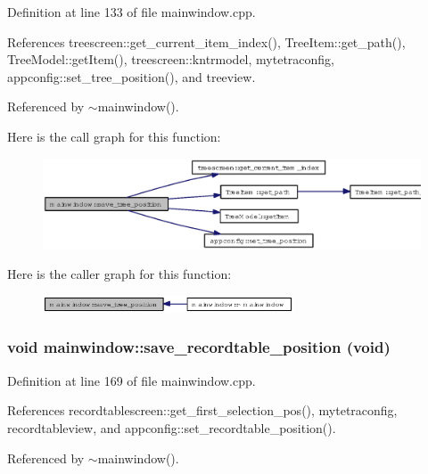 Definition at line 133 of file mainwindow.cpp.

References treescreen::get\_\-current\_\-item\_\-index(), Tree\-Item::get\_\-path(), Tree\-Model::get\-Item(), treescreen::kntrmodel, mytetraconfig, appconfig::set\_\-tree\_\-position(), and treeview.

Referenced by $\sim$mainwindow().

Here is the call graph for this function:\begin{figure}[H]
\begin{center}
\leavevmode
\includegraphics[width=395pt]{classmainwindow_aa0957056623adcd87ea0d28c2e9f671_cgraph}
\end{center}
\end{figure}


Here is the caller graph for this function:\begin{figure}[H]
\begin{center}
\leavevmode
\includegraphics[width=211pt]{classmainwindow_aa0957056623adcd87ea0d28c2e9f671_icgraph}
\end{center}
\end{figure}
\subsubsection{\setlength{\rightskip}{0pt plus 5cm}void mainwindow::save\_\-recordtable\_\-position (void)\hspace{0.3cm}{\tt  [private]}}\label{classmainwindow_de588e1f1c0cc027d50038e075c90de2}




Definition at line 169 of file mainwindow.cpp.

References recordtablescreen::get\_\-first\_\-selection\_\-pos(), mytetraconfig, recordtableview, and appconfig::set\_\-recordtable\_\-position().

Referenced by $\sim$mainwindow().

